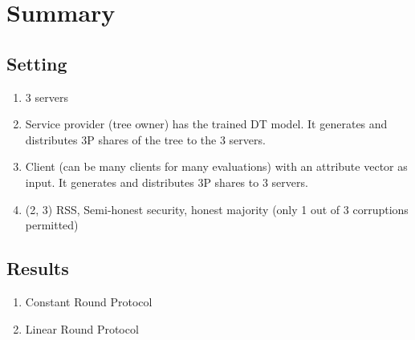 
\clearpage
{}

%
\setcounter{section}{0} %

\section{Summary}

\subsection{Setting}
\begin{enumerate}
    \item 3 servers
    \item Service provider (tree owner) has the trained DT model. It generates and distributes 3P shares of the tree to the 3 servers.
    \item Client (can be many clients for many evaluations) with an attribute vector as input. It generates and distributes 3P shares to 3 servers.
    \item (2, 3) RSS, Semi-honest security, honest majority (only 1 out of 3 corruptions permitted)
\end{enumerate}

\subsection{Results}
\begin{enumerate}
    \item Constant Round Protocol
    \item Linear Round Protocol 
\end{enumerate}





%
